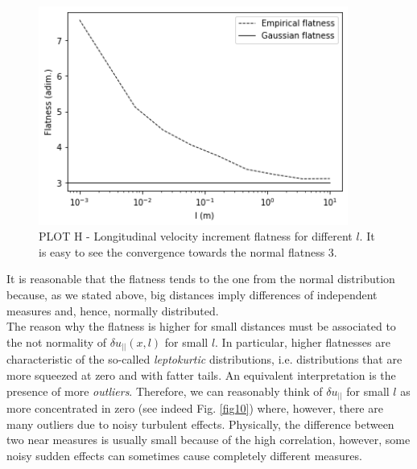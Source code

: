 \documentclass[11pt,titlepage]{article}
\begin{document}
\begin{center}
	\begin{figure} [h]
		\centering
		\includegraphics[width = 4in]{./figures/ex1_6_1.png}
		\caption{PLOT H - Longitudinal velocity increment flatness for different $l$. It is easy to see the convergence towards the normal flatness 3.}
		\label{fig11}
	\end{figure}
\end{center}
It is reasonable that the flatness tends to the one from the normal distribution because, as we stated above, big distances imply differences of independent measures and, hence, normally distributed. \\
The reason why the flatness is higher for small distances must be associated to the not normality of $\delta u_{||}(x,l)$ for small $l$. In particular, higher flatnesses are characteristic of the so-called \emph{leptokurtic} distributions, i.e. distributions that are more squeezed at zero and with fatter tails. An equivalent interpretation is the presence of more \emph{outliers}. Therefore, we can reasonably think of $\delta u_{||}$ for small $l$ as more concentrated in zero (see indeed Fig. \ref{fig10}) where, however, there are many outliers due to noisy turbulent effects. Physically, the difference between two near measures is usually small because of the high correlation, however, some noisy sudden effects can sometimes cause completely different measures.
\end{document}
